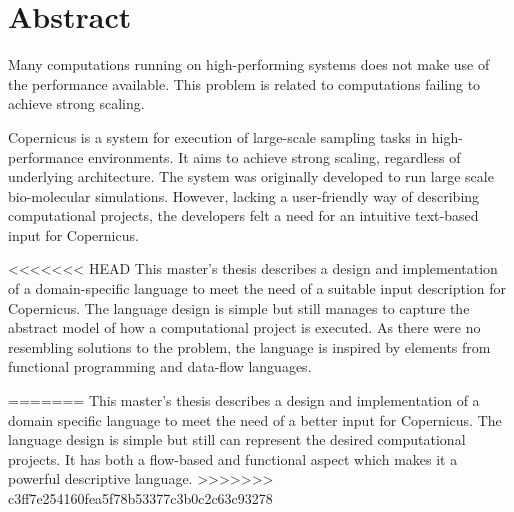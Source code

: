 \begingroup
\let\clearpage\relax
\let\cleardoublepage\relax
\let\cleardoublepage\relax

\chapter*{Abstract}

Many computations running on high-performing systems does not make use
of the performance available. This problem is related to computations
failing to achieve strong scaling.

Copernicus is a system for execution of large-scale sampling tasks in
high-performance environments. It aims to achieve strong scaling,
regardless of underlying architecture. The system was originally
developed to run large scale bio-molecular simulations. However,
lacking a user-friendly way of describing computational projects, the
developers felt a need for an intuitive text-based input for
Copernicus.

<<<<<<< HEAD
This master's thesis describes a design and implementation of a
domain-specific language to meet the need of a suitable input
description for Copernicus. The language design is simple but still
manages to capture the abstract model of how a computational project
is executed. As there were no resembling solutions to the problem, the
language is inspired by elements from functional programming and
data-flow languages.

=======
This master's thesis describes a design and implementation of a domain
specific language to meet the need of a better input for
Copernicus. The language design is simple but still can represent the
desired computational projects. It has both a flow-based and
functional aspect which makes it a powerful descriptive language.
>>>>>>> c3ff7e254160fea5f78b53377c3b0c2c63c93278

\endgroup			

\vfill
